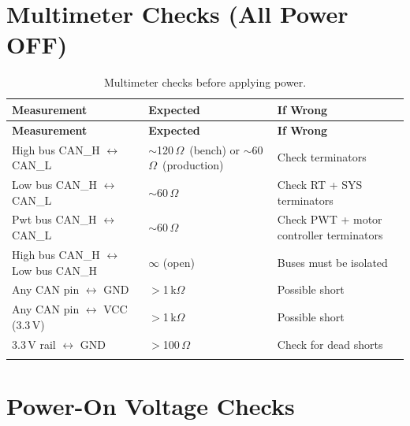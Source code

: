 \documentclass[12pt,a4paper,oneside]{report}
\begin{document}
\section{Multimeter Checks (All Power OFF)}

\begin{center}
\begin{longtable}{p{65mm} p{35mm} p{45mm}}
\toprule
\textbf{Measurement} & \textbf{Expected} & \textbf{If Wrong} \\
\midrule
\endfirsthead
\toprule
\textbf{Measurement} & \textbf{Expected} & \textbf{If Wrong} \\
\midrule
\endhead
High bus CAN\_H $\leftrightarrow$ CAN\_L   & $\sim$120\,$\Omega$\ (bench) or $\sim$60\,$\Omega$\ (production) & Check terminators \\
Low bus CAN\_H $\leftrightarrow$ CAN\_L    & $\sim$60\,$\Omega$   & Check RT + SYS terminators \\
Pwt bus CAN\_H $\leftrightarrow$ CAN\_L    & $\sim$60\,$\Omega$   & Check PWT + motor controller terminators \\
High bus CAN\_H $\leftrightarrow$ Low bus CAN\_H & $\infty$ (open)   & Buses must be isolated \\
Any CAN pin $\leftrightarrow$ GND          & $>$1\,k$\Omega$      & Possible short \\
Any CAN pin $\leftrightarrow$ VCC (3.3\,V) & $>$1\,k$\Omega$      & Possible short \\
3.3\,V rail $\leftrightarrow$ GND          & $>$100\,$\Omega$     & Check for dead shorts \\
\bottomrule
\caption{Multimeter checks before applying power.}
\end{longtable}
\end{center}

\section{Power-On Voltage Checks}
\end{document}
